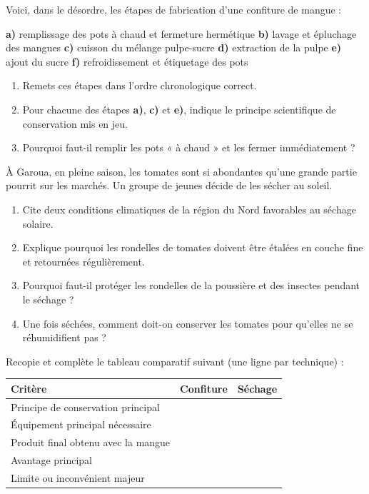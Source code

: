 \documentclass[11pt]{article}
\newcounter{popsec}
\newcounter{popsub}
\newcommand{\courssub}[1]{%
  \stepcounter{popsub}%
  \par\vspace{9pt}\noindent{\popxbold\fontsize{11.5}{13}\selectfont\color{popink}{\color{poporange}\thepopsec.\thepopsub}\hspace{6pt}#1}\par\nopagebreak\vspace{4pt}
}
\begin{document}
\courssub{Je m'entraîne}

\begin{exercice}
Voici, dans le désordre, les étapes de fabrication d'une confiture de mangue :
\begin{center}
\textbf{a)} remplissage des pots à chaud et fermeture hermétique \quad
\textbf{b)} lavage et épluchage des mangues \quad
\textbf{c)} cuisson du mélange pulpe-sucre \quad
\textbf{d)} extraction de la pulpe \quad
\textbf{e)} ajout du sucre \quad
\textbf{f)} refroidissement et étiquetage des pots
\end{center}
\begin{enumerate}
\item Remets ces étapes dans l'ordre chronologique correct.
\item Pour chacune des étapes \textbf{a)}, \textbf{c)} et \textbf{e)}, indique le principe scientifique de conservation mis en jeu.
\item Pourquoi faut-il remplir les pots « à chaud » et les fermer immédiatement ?
\end{enumerate}
\end{exercice}

\begin{exercice}
À Garoua, en pleine saison, les tomates sont si abondantes qu'une grande partie pourrit sur les marchés. Un groupe de jeunes décide de les sécher au soleil.
\begin{enumerate}
\item Cite deux conditions climatiques de la région du Nord favorables au séchage solaire.
\item Explique pourquoi les rondelles de tomates doivent être étalées en couche fine et retournées régulièrement.
\item Pourquoi faut-il protéger les rondelles de la poussière et des insectes pendant le séchage ?
\item Une fois séchées, comment doit-on conserver les tomates pour qu'elles ne se réhumidifient pas ?
\end{enumerate}
\end{exercice}

\begin{exercice}
Recopie et complète le tableau comparatif suivant (une ligne par technique) :
\begin{center}
\begin{tabularx}{\linewidth}{|l|X|X|}
\hline
\rowcolor{popblueL} \textbf{Critère} & \textbf{Confiture} & \textbf{Séchage} \\
\hline
Principe de conservation principal & & \\
\hline
Équipement principal nécessaire & & \\
\hline
Produit final obtenu avec la mangue & & \\
\hline
Avantage principal & & \\
\hline
Limite ou inconvénient majeur & & \\
\hline
\end{tabularx}
\end{center}
\end{exercice}
\end{document}
